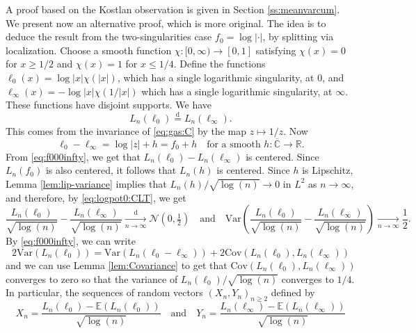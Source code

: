 \documentclass[10pt,reqno]{amsart}
\numberwithin{equation}{section}
\numberwithin{figure}{section}
\theoremstyle{plain}
\newcommand{\<}{\langle}
\renewcommand{\>}{\rangle}
\begin{document}
A proof based on the Kostlan observation is given in Section \ref{ss:meanvarcum}. We present now an alternative proof, which is more original. The idea is to deduce the result from the two-singularities case $f_0=\log\left|\cdot\right|$, by splitting via localization. Choose a smooth function $\chi: [0,\infty) \to [0,1]$ satisfying $\chi(x) = 0$ for $x \geq 1/2$ and $\chi(x) = 1$ for $x \leq 1/4$.
Define the functions $\ell_0(x) = \log|x| \chi(|x|)$, which has a single logarithmic singularity, at $0$, and $\ell_\infty(x) = -\log|x| \chi(1/|x|)$ which has a single logarithmic singularity, at $\infty$. These functions have disjoint supports. We have 
\begin{equation}\label{eq:f000infty}
  L_n(\ell_0)
  \overset{\mathrm{d}}{=} 
  L_n(\ell_\infty).
\end{equation}
This comes from the invariance of \eqref{eq:gas:C} by the map $z\mapsto 1/z$.
Now 
\begin{equation}\label{eq:f0split}
    \ell_0 - \ell_\infty =
    \log|z| + h = f_0 + h
    \quad\text{for a smooth $h:\overline{\mathbb C} \to \mathbb R$}.
\end{equation}
From \eqref{eq:f000infty}, we get that $L_n(\ell_0)-L_n(\ell_\infty)$ is centered.
Since $L_n(f_0)$ is also centered, it follows that $L_n(h)$ is centered.
Since $h$ is Lipschitz, Lemma \ref{lem:lip-variance} implies that $L_n(h)/\sqrt{\log(n)}\to0$ in $L^2$ as $n\to\infty$, and therefore, by \eqref{eq:logpot0:CLT}, we get
\begin{equation}
\frac{L_n(\ell_0)}{\sqrt{\log(n)}}
-\frac{L_n(\ell_\infty)}{\sqrt{\log(n)}}
\xrightarrow[n\to\infty]{\mathrm{d}}
\mathcal{N}(0,\tfrac{1}{2})
\quad\text{and}\quad
\mathrm{Var}\left(\frac{L_n(\ell_0)}{\sqrt{\log(n)}}-\frac{L_n(\ell_\infty)}{\sqrt{\log(n)}}\right)
\xrightarrow[n\to\infty]{}\frac{1}{2}.
\end{equation}
By \eqref{eq:f000infty}, we can write
\begin{equation}
2\mathrm{Var}(L_n(\ell_0))
=\mathrm{Var}(L_n(\ell_0 - \ell_\infty))
+ 2 \mathrm{Cov}(L_n(\ell_0),L_n(\ell_\infty))
\end{equation}
and we can use Lemma \ref{lem:Covariance} 
to get that
$\mathrm{Cov}(L_n(\ell_0), L_n(\ell_\infty))$
converges to zero so that
the variance of
$L_n(\ell_0)/\sqrt{\log(n)}$ converges
to $1/4$. In particular,
the sequences of random vectors
$(X_n,Y_n)_{n \geq 2}$ defined by
\begin{equation} 
X_n = \frac{L_n(\ell_0)-
\mathbb E(L_n(\ell_0))}{\sqrt{\log(n)}}
\quad\text{and}\quad
Y_n=\frac{L_n(\ell_\infty)-
\mathbb E(L_n(\ell_\infty))}{\sqrt{\log(n)}}
\end{equation}
\end{document}
